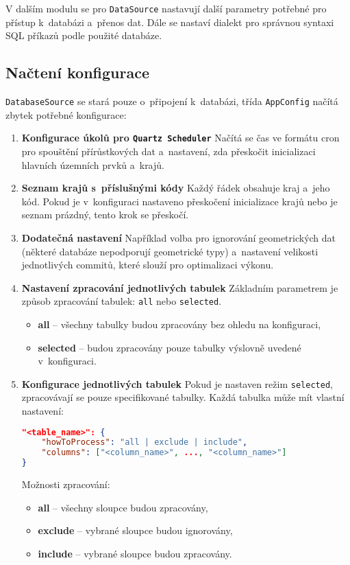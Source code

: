 V dalším modulu se pro \texttt{DataSource} nastavují další parametry potřebné pro přístup k~databázi a~přenos dat.  
Dále se nastaví dialekt pro správnou syntaxi SQL příkazů podle použité databáze.

\subsection{Načtení konfigurace}
\label{sec:konfigurace}
\texttt{DatabaseSource} se stará pouze o~připojení k~databázi,  
třída \texttt{AppConfig} načítá zbytek potřebné konfigurace:
\begin{enumerate}
    \item \textbf{Konfigurace úkolů pro \texttt{Quartz Scheduler}}  
    Načítá se čas ve formátu cron pro spouštění přírůstkových dat  
    a~nastavení, zda přeskočit inicializaci hlavních územních prvků a~krajů.
    \item \textbf{Seznam krajů s~příslušnými kódy}  
    Každý řádek obsahuje kraj a~jeho kód.  
    Pokud je v~konfiguraci nastaveno přeskočení inicializace krajů nebo je seznam prázdný, tento krok se přeskočí.
    \item \textbf{Dodatečná nastavení}  
    Například volba pro ignorování geometrických dat  
    (některé databáze nepodporují geometrické typy)  
    a~nastavení velikosti jednotlivých commitů, které slouží pro optimalizaci výkonu.
    \item \textbf{Nastavení zpracování jednotlivých tabulek}
    Základním parametrem je způsob zpracování tabulek: \texttt{all} nebo \texttt{selected}.  
    \begin{itemize}
        \item \textbf{all} -- všechny tabulky budou zpracovány bez ohledu na konfiguraci,
        \item \textbf{selected} -- budou zpracovány pouze tabulky výslovně uvedené v~konfiguraci.
    \end{itemize}
    \item \textbf{Konfigurace jednotlivých tabulek}  
    Pokud je nastaven režim \texttt{selected}, zpracovávají se pouze specifikované tabulky.  
    Každá tabulka může mít vlastní nastavení:
    \begin{lstlisting}[language=json, caption={Konfigurace tabulek}, label=lst:konfTabulek]
"<table_name>": {
    "howToProcess": "all | exclude | include",
    "columns": ["<column_name>", ..., "<column_name>"]
}
    \end{lstlisting}
    
    Možnosti zpracování:
    \begin{itemize}
        \item \textbf{all} -- všechny sloupce budou zpracovány,
        \item \textbf{exclude} -- vybrané sloupce budou ignorovány,
        \item \textbf{include} -- vybrané sloupce budou zpracovány.
    \end{itemize}


\end{enumerate}
